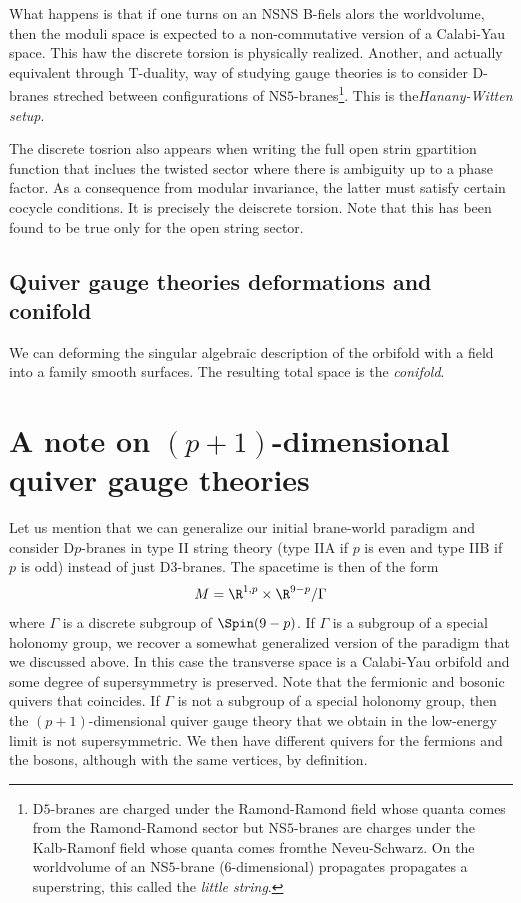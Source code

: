 \documentclass{worksheetclass}
\begin{document}
        What happens is that if one turns on an NSNS B-fiels alors the worldvolume, then the moduli space is expected to a non-commutative version of a Calabi-Yau space. This haw the discrete torsion is physically realized. Another, and actually equivalent through T-duality, way of studying gauge theories is to consider D-branes streched between configurations of NS$5$-branes\footnote{D$5$-branes are charged under the Ramond-Ramond field whose quanta comes from the Ramond-Ramond sector but NS$5$-branes are charges under the Kalb-Ramonf field whose quanta comes fromthe Neveu-Schwarz. On the worldvolume of an NS$5$-brane (6-dimensional) propagates propagates a superstring, this called the \emph{little string}.}. This is the\emph{Hanany-Witten setup}.

        The discrete tosrion also appears when writing the full open strin gpartition function that inclues the twisted sector where there is ambiguity up to a phase factor. As a consequence from modular invariance, the latter must satisfy certain cocycle conditions. It is precisely the deiscrete torsion. Note that this has been found to be true only for the open string sector.

    \subsection{Quiver gauge theories deformations and conifold}

        We can deforming the singular algebraic description of the orbifold with a field into a family smooth surfaces. The resulting total space is the \emph{conifold}.

\section{A note on $(p+1)$-dimensional quiver gauge theories}

    Let us mention that we can generalize our initial brane-world paradigm and consider D$p$-branes in type II string theory (type IIA if $p$ is even and type IIB if $p$ is odd) instead of just D$3$-branes. The spacetime is then of the form
    \begin{equation}
        M = \R^{1,p}\times\R^{9-p}/\Gamma
    \end{equation}
    where $\Gamma$ is a discrete subgroup of $\Spin(9-p)$. If $\Gamma$ is a subgroup of a special holonomy group, we recover a somewhat generalized version of the paradigm that we discussed above. In this case the transverse space is a Calabi-Yau orbifold and some degree of supersymmetry is preserved. Note that the fermionic and bosonic quivers that coincides. If $\Gamma$ is not a subgroup of a special holonomy group, then the $(p+1)$-dimensional quiver gauge theory that we obtain in the low-energy limit is not supersymmetric. We then have different quivers for the fermions and the bosons, although with the same vertices, by definition.
\end{document}
